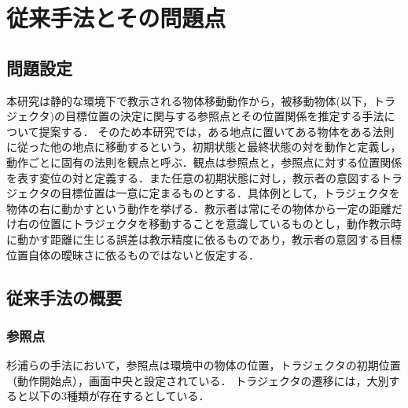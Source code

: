 ﻿%
\chapter{従来手法とその問題点}

\section{問題設定}

本研究は静的な環境下で教示される物体移動動作から，被移動物体(以下，トラジェクタ)の目標位置の決定に関与する参照点とその位置関係を推定する手法について提案する．
そのため本研究では，ある地点に置いてある物体をある法則に従った他の地点に移動するという，初期状態と最終状態の対を動作と定義し，動作ごとに固有の法則を観点と呼ぶ．観点は参照点と，参照点に対する位置関係を表す変位の対と定義する．また任意の初期状態に対し，教示者の意図するトラジェクタの目標位置は一意に定まるものとする．具体例として，トラジェクタを物体の右に動かすという動作を挙げる．教示者は常にその物体から一定の距離だけ右の位置にトラジェクタを移動することを意識しているものとし，動作教示時に動かす距離に生じる誤差は教示精度に依るものであり，教示者の意図する目標位置自体の曖昧さに依るものではないと仮定する．

\section{従来手法の概要}

\subsection{参照点}

杉浦ら\cite{sugiura}の手法において，参照点は環境中の物体の位置，トラジェクタの初期位置（動作開始点），画面中央と設定されている．
トラジェクタの遷移には，大別すると以下の3種類が存在するとしている．


